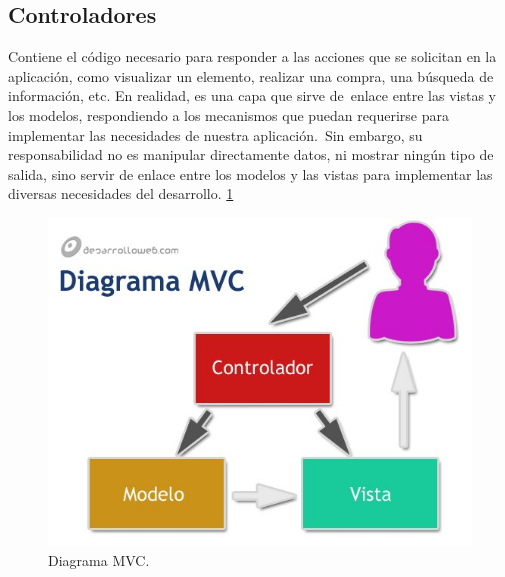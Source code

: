 \subsection{Controladores}
Contiene el código necesario para responder a las acciones que se solicitan en la aplicación, como visualizar un elemento, realizar una compra, una búsqueda de información, etc.
En realidad, es una capa que sirve de enlace entre las vistas y los modelos, respondiendo a los mecanismos que puedan requerirse para implementar las necesidades de nuestra aplicación. Sin embargo, su responsabilidad no es manipular directamente datos, ni mostrar ningún tipo de salida, sino servir de enlace entre los modelos y las vistas para implementar las diversas necesidades del desarrollo. \cite{marco3} \ref{figura8}
\begin{figure}[h]
  \label{figura8}
  \centering
  \includegraphics[scale=.35]{lib/assets/8}
  \caption{Diagrama MVC.}
\end{figure}





